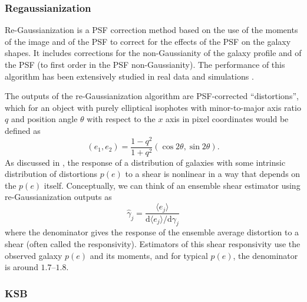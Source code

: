 \documentclass[iop]{emulateapj}
\begin{document}
\subsubsection{Regaussianization}

Re-Gaussianization \citep{2003MNRAS.343..459H} is a PSF correction
method based on the use of the moments of the image and of the PSF to
correct for the effects of the PSF on the galaxy shapes. It includes
corrections for the non-Gaussianity of the galaxy profile
\citep{2002AJ....123..583B,2003MNRAS.343..459H} and of the PSF (to
first order in the PSF non-Gaussianity). The performance of this
algorithm has been extensively studied in real data and simulations
\citep[e.g.,][]{2005MNRAS.361.1287M,2012MNRAS.420.1518M,2013MNRAS.432.1544M,2015MNRAS.450.2963M}.

The outputs of the re-Gaussianization algorithm are PSF-corrected
``distortions'', which for an object with purely elliptical isophotes
with minor-to-major axis ratio $q$ and position angle $\theta$ with
respect to the $x$ axis in pixel coordinates would be defined as
\begin{equation}
(e_1, e_2) = \frac{1-q^2}{1+q^2}\left(\cos{2\theta},\sin{2\theta}\right).
\end{equation}
As discussed in \cite{2002AJ....123..583B}, the response of a
distribution of galaxies with some intrinsic distribution of
distortions $p(e)$ to a shear is nonlinear in a way that depends on
the $p(e)$ itself.  Conceptually, we can think of an ensemble shear
estimator using re-Gaussianization outputs as
\begin{equation}
\hat{\gamma}_j = \frac{\langle e_j\rangle}{\mathrm{d}\langle e_j\rangle/\mathrm{d}\gamma_j}
\end{equation}
where the denominator gives the response of the ensemble average
distortion to a shear (often called the responsivity).  Estimators of
this shear responsivity use the observed galaxy $p(e)$ and its
moments, and for typical $p(e)$, the denominator is around
$1.7$--$1.8$.

\subsubsection{KSB}
\end{document}

